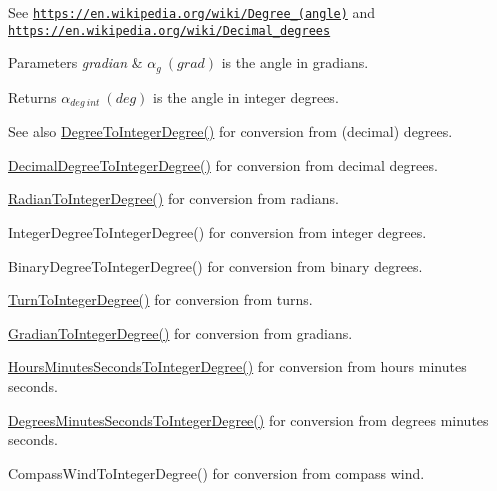 See \href{https://en.wikipedia.org/wiki/Degree_(angle)}{\tt https\+://en.\+wikipedia.\+org/wiki/\+Degree\+\_\+(angle)} and \href{https://en.wikipedia.org/wiki/Decimal_degrees}{\tt https\+://en.\+wikipedia.\+org/wiki/\+Decimal\+\_\+degrees} 
\begin{DoxyParams}{Parameters}
{\em gradian} & $\alpha_{g}\ (grad)$ is the angle in gradians. \\
\hline
\end{DoxyParams}
\begin{DoxyReturn}{Returns}
$\alpha_{deg\ int}\ (deg)$ is the angle in integer degrees. 
\end{DoxyReturn}
\begin{DoxySeeAlso}{See also}
\mbox{\hyperlink{group___e_g_x_math-_angle_conversions-_degree_gaabd20f21be3c18ee423d0bc1a677c6f6}{Degree\+To\+Integer\+Degree()}} for conversion from (decimal) degrees. 

\mbox{\hyperlink{group___e_g_x_math-_angle_conversions-_decimal_degree_ga115239ea7202dbc6a6c9fba68e0ac189}{Decimal\+Degree\+To\+Integer\+Degree()}} for conversion from decimal degrees. 

\mbox{\hyperlink{group___e_g_x_math-_angle_conversions-_radian_gac84796dfdeb56235e1e338522a5f9350}{Radian\+To\+Integer\+Degree()}} for conversion from radians. 

Integer\+Degree\+To\+Integer\+Degree() for conversion from integer degrees. 

Binary\+Degree\+To\+Integer\+Degree() for conversion from binary degrees. 

\mbox{\hyperlink{group___e_g_x_math-_angle_conversions-_turn_ga999085c62490997da870618e20e88ebb}{Turn\+To\+Integer\+Degree()}} for conversion from turns. 

\mbox{\hyperlink{group___e_g_x_math-_angle_conversions-_gradian_ga555aae885f8a7d0876a36aa07cbbd816}{Gradian\+To\+Integer\+Degree()}} for conversion from gradians. 

\mbox{\hyperlink{group___e_g_x_math-_angle_conversions-_hours_minutes_seconds_gadf3829ca1704cfd64886a4de1b3e366f}{Hours\+Minutes\+Seconds\+To\+Integer\+Degree()}} for conversion from hours minutes seconds. 

\mbox{\hyperlink{group___e_g_x_math-_angle_conversions-_degrees_minutes_seconds_ga973287a878e521e3c1d4d1f973ecdcfe}{Degrees\+Minutes\+Seconds\+To\+Integer\+Degree()}} for conversion from degrees minutes seconds. 

Compass\+Wind\+To\+Integer\+Degree() for conversion from compass wind. 
\end{DoxySeeAlso}
\mbox{\label{group___e_g_x_math-_angle_conversions-_gradian_gab7781c860ea3ab9c9cf76ab639846a07}} 
